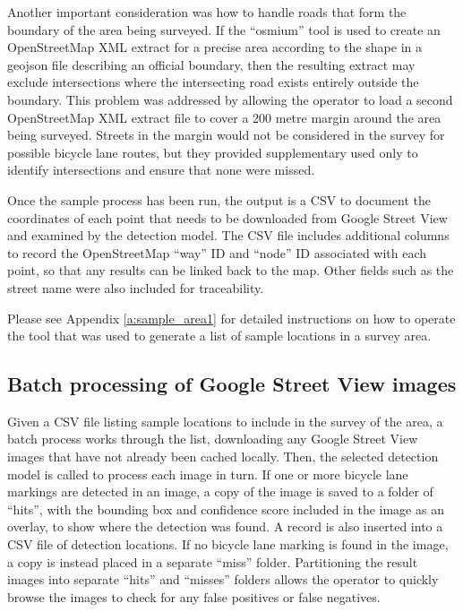 \documentclass[11pt,twoside]{report}
\begin{document}
Another important consideration was how to handle roads that form the boundary of the area being surveyed.  If the ``osmium'' tool is used to create an OpenStreetMap XML extract for a precise area according to the shape in a geojson file describing an official boundary, then the resulting extract may exclude intersections where the intersecting road exists entirely outside the boundary.  This problem was addressed by allowing the operator to load a second OpenStreetMap XML extract file to cover a 200 metre margin around the area being surveyed.  Streets in the margin would not be considered in the survey for possible bicycle lane routes, but they provided supplementary used only to identify intersections and ensure that none were missed.

Once the sample process has been run, the output is a CSV to document the coordinates of each point that needs to be downloaded from Google Street View and examined by the detection model.  The CSV file includes additional columns to record the OpenStreetMap ``way'' ID and ``node'' ID associated with each point, so that any results can be linked back to the map.  Other fields such as the street name were also included for traceability.

Please see Appendix \ref{a:sample_area1} for detailed instructions on how to operate the tool that was used to generate a list of sample locations in a survey area.


\subsection{Batch processing of Google Street View images}
\label{s:rq2b}

Given a CSV file listing sample locations to include in the survey of the area, a batch process works through the list, downloading any Google Street View images that have not already been cached locally.  Then, the selected detection model is called to process each image in turn.  If one or more bicycle lane markings are detected in an image, a copy of the image is saved to a folder of ``hits'', with the bounding box and confidence score included in the image as an overlay, to show where the detection was found.  A record is also inserted into a CSV file of detection locations.  If no bicycle lane marking is found in the image, a copy is instead placed in a separate ``miss'' folder.  Partitioning the result images into separate  ``hits'' and ``misses'' folders allows the operator to quickly browse the images to check for any false positives or false negatives.
\end{document}
